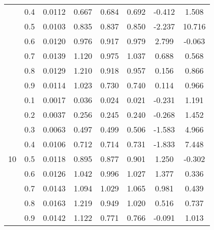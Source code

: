 \documentclass[11pt,a4paper]{report}
\begin{document}
\begin{longtable}{ | c | c || c | c | c | c | c | c | }
 & 0.4 & 0.0112 & 0.667 & 0.684 & 0.692 & -0.412 & 1.508 \\
 & 0.5 & 0.0103 & 0.835 & 0.837 & 0.850 & -2.237 & 10.716 \\
 & 0.6 & 0.0120 & 0.976 & 0.917 & 0.979 & 2.799 & -0.063 \\
 & 0.7 & 0.0139 & 1.120 & 0.975 & 1.037 & 0.688 & 0.568 \\
 & 0.8 & 0.0129 & 1.210 & 0.918 & 0.957 & 0.156 & 0.866 \\
 & 0.9 & 0.0114 & 1.023 & 0.730 & 0.740 & 0.114 & 0.966 \\
 \hline
\multirow{9}{*}{10} & 0.1 & 0.0017 & 0.036 & 0.024 & 0.021 & -0.231 & 1.191 \\
 & 0.2 & 0.0037 & 0.256 & 0.245 & 0.240 & -0.268 & 1.452 \\
 & 0.3 & 0.0063 & 0.497 & 0.499 & 0.506 & -1.583 & 4.966 \\
 & 0.4 & 0.0106 & 0.712 & 0.714 & 0.731 & -1.833 & 7.448 \\
 & 0.5 & 0.0118 & 0.895 & 0.877 & 0.901 & 1.250 & -0.302 \\
 & 0.6 & 0.0126 & 1.042 & 0.996 & 1.027 & 1.377 & 0.336 \\
 & 0.7 & 0.0143 & 1.094 & 1.029 & 1.065 & 0.981 & 0.439 \\
 & 0.8 & 0.0163 & 1.219 & 0.949 & 1.020 & 0.516 & 0.737 \\
 & 0.9 & 0.0142 & 1.122 & 0.771 & 0.766 & -0.091 & 1.013 \\
 \hline
\hline
\end{longtable}
\end{document}
